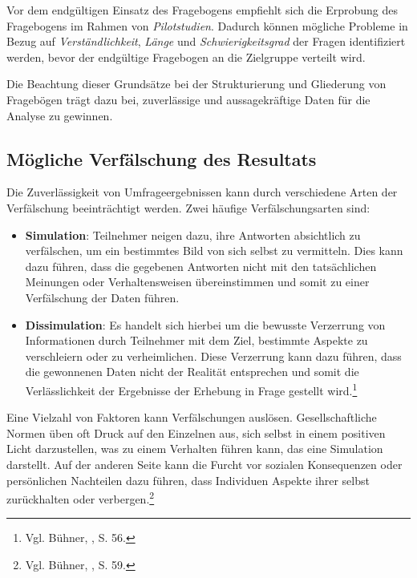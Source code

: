 Vor dem endgültigen Einsatz des Fragebogens empfiehlt sich die Erprobung des Fragebogens im Rahmen von \textit{Pilotstudien}.
Dadurch können mögliche Probleme in Bezug auf \textit{Verständlichkeit}, \textit{Länge} und \textit{Schwierigkeitsgrad}
der Fragen identifiziert werden, bevor der endgültige Fragebogen an die Zielgruppe verteilt wird.

Die Beachtung dieser Grundsätze bei der Strukturierung und Gliederung von Fragebögen trägt dazu bei, zuverlässige und
aussagekräftige Daten für die Analyse zu gewinnen.

\subsection{Mögliche Verfälschung des Resultats}
Die Zuverlässigkeit von Umfrageergebnissen kann durch verschiedene Arten der Verfälschung beeinträchtigt werden. Zwei
häufige Verfälschungsarten sind:
\begin{itemize}
    \item \textbf{Simulation}: Teilnehmer neigen dazu, ihre Antworten absichtlich zu verfälschen, um ein bestimmtes Bild
    von sich selbst zu vermitteln. Dies kann dazu führen, dass die gegebenen Antworten nicht mit den tatsächlichen
    Meinungen oder Verhaltensweisen übereinstimmen und somit zu einer Verfälschung der Daten führen.

    \item \textbf{Dissimulation}: Es handelt sich hierbei um die bewusste Verzerrung von Informationen durch Teilnehmer
    mit dem Ziel, bestimmte Aspekte zu verschleiern oder zu verheimlichen. Diese Verzerrung kann dazu führen, dass die
    gewonnenen Daten nicht der Realität entsprechen und somit die Verlässlichkeit der Ergebnisse der Erhebung in Frage
    gestellt wird.\footnote{Vgl. Bühner, \cite{Einfuehrung in die TEst und Fragebogenkonstruktion}, S. 56.}\\
\end{itemize}

Eine Vielzahl von Faktoren kann Verfälschungen auslösen. Gesellschaftliche Normen üben oft Druck auf den Einzelnen aus,
sich selbst in einem positiven Licht darzustellen, was zu einem Verhalten führen kann, das eine Simulation darstellt. Auf
der anderen Seite kann die Furcht vor sozialen Konsequenzen oder persönlichen Nachteilen dazu führen, dass Individuen
Aspekte ihrer selbst zurückhalten oder verbergen.\footnote{Vgl. Bühner, \cite{Einfuehrung in die TEst und Fragebogenkonstruktion}, S. 59.}


